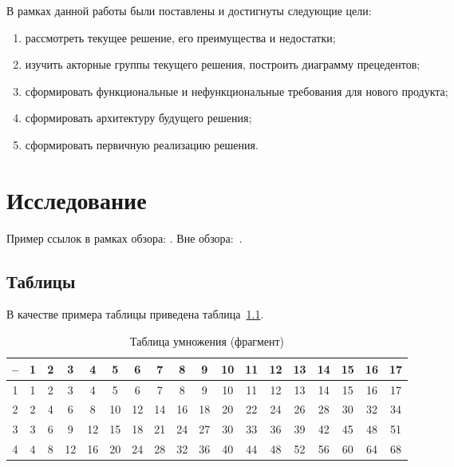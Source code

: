 \documentclass[times,numbers=noenddot]{itmo-student-thesis}
\begin{document}
В рамках данной работы были поставлены и достигнуты следующие цели:

\begin{enumerate}[label=\arabic*.]
	\item рассмотреть текущее решение, его преимущества и недостатки;
	\item изучить акторные группы текущего решения, построить диаграмму прецедентов;
	\item сформировать функциональные и нефункциональные требования для нового продукта;
	\item сформировать архитектуру будущего решения;
	\item сформировать первичную реализацию решения.
\end{enumerate}

\leftalignedtrue
\chapter{Исследование}
\leftalignedfalse



\startrelatedwork
Пример ссылок в рамках обзора: \cite{example-english, example-russian, unrestricted-jump-evco, doerr-doerr-lambda-lambda-self-adjustment-arxiv}.
\finishrelatedwork
Вне обзора:~\cite{bellman}.

\section{Таблицы}\label{sec:tables}

В качестве примера таблицы приведена таблица~\ref{tab1}.

\begin{table}[!h]
	\caption{Таблица умножения (фрагмент)}\label{tab1}
	\centering
	\begin{tabular}{|*{18}{c|}}\hline
		-- & 1 & 2 & 3  & 4  & 5  & 6  & 7  & 8  & 9  & 10 & 11 & 12 & 13 & 14 & 15 & 16 & 17 \\\hline
		1  & 1 & 2 & 3  & 4  & 5  & 6  & 7  & 8  & 9  & 10 & 11 & 12 & 13 & 14 & 15 & 16 & 17 \\\hline
		2  & 2 & 4 & 6  & 8  & 10 & 12 & 14 & 16 & 18 & 20 & 22 & 24 & 26 & 28 & 30 & 32 & 34 \\\hline
		3  & 3 & 6 & 9  & 12 & 15 & 18 & 21 & 24 & 27 & 30 & 33 & 36 & 39 & 42 & 45 & 48 & 51 \\\hline
		4  & 4 & 8 & 12 & 16 & 20 & 24 & 28 & 32 & 36 & 40 & 44 & 48 & 52 & 56 & 60 & 64 & 68 \\\hline
	\end{tabular}
\end{table}
\end{document}
